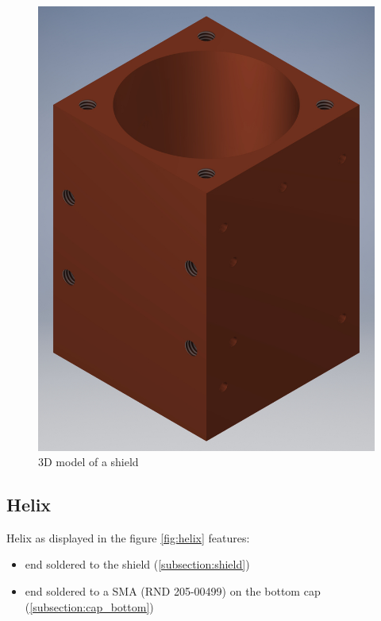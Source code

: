 \begin{figure}[h]
	\centering
	\includegraphics[width=.78\textwidth]{images/shield_small}
	\caption{3D model of a shield}
	\label{fig:shield}
\end{figure}

\clearpage
\subsection{Helix}
\label{subsection:helix}
Helix as displayed in the figure \ref{fig:helix} features:
\begin{itemize}
	\item end soldered to the shield (\ref{subsection:shield})
	\item end soldered to a SMA (RND 205-00499) on the bottom cap (\ref{subsection:cap_bottom})
\end{itemize}

